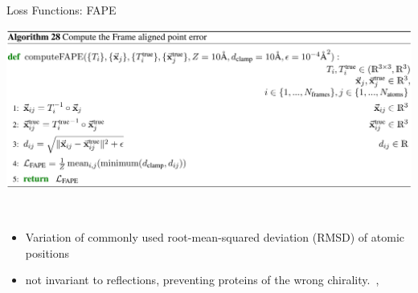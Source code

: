 \documentclass[presentation, smaller]{beamer}
\begin{document}
\begin{frame}[label={sec:org28be407}]{Loss Functions: FAPE}
\begin{center}
\includegraphics[width=.9\linewidth]{./imgs/fape-algo.png}
\end{center}~\cite{jumperHighlyAccurateProtein2021}

\begin{itemize}
\item Variation of commonly used root-mean-squared deviation (RMSD) of atomic positions
\item not invariant to reflections, preventing proteins of the wrong chirality.~\cite{rubieraAlphaFoldHereWhat},~\cite{jumperHighlyAccurateProtein2021}
\end{itemize}
\end{frame}
\end{document}
